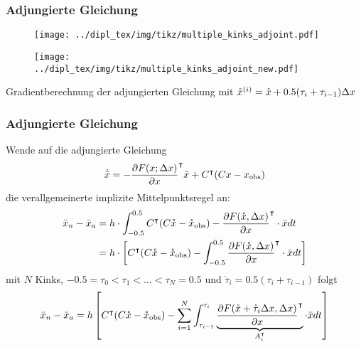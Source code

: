 \begin{frame}[<+->]
\frametitle{Adjungierte Gleichung}
\begin{figure}
\centering
\texttt{[image: ../dipl\_tex/img/tikz/multiple\_kinks\_adjoint.pdf]}
\end{figure}
\begin{figure}
\centering
\texttt{[image: ../dipl\_tex/img/tikz/multiple\_kinks\_adjoint\_new.pdf]}
\end{figure}
\centering
Gradientberechnung der adjungierten Gleichung mit $\mathring{x}^{(i)} = \mathring{x} + 0.5(\tau_i+\tau_{i-1})\Delta x$
\end{frame}

\begin{frame}[<+->]
\frametitle{Adjungierte Gleichung}
Wende auf die adjungierte Gleichung
\begin{align}
 \dot {\bar{x}} =  - \frac{\partial F(x;\Delta x)}{\partial x}^\intercal \bar{x} + C^\intercal (Cx-x_\text{obs}) 
\end{align}
\pause
die verallgemeinerte implizite Mittelpunktsregel an:
\begin{align}
\bar{x}_n - \bar{x}_a &= h\cdot \int_{-0.5}^{0.5}C^\intercal(C\mathring{x}-\mathring x_\text{obs}) - \frac{\partial F(\mathring{x},\Delta x)}{\partial x}^\intercal \cdot \bar{x} dt\\
		  &= h\cdot \left[ C^\intercal(C\mathring{x}-\mathring x_\text{obs}) -\int_{-0.5}^{0.5} \frac{\partial F(\mathring{x},\Delta x)}{\partial x}^\intercal \cdot \bar{x} dt\right]
\end{align}
\pause
mit $N$ Kinks, $-0.5 = \tau_0 <\tau_1 <\ldots < \tau_N=0.5$ und $\mathring \tau_i = 0.5 (\tau_i +\tau_{i-1})$ folgt
\begin{align}
\bar{x}_n - \bar{x}_a &= h\left[ C^\intercal(C\mathring{x}-\mathring x_\text{obs}) - \sum_{i=1}^N \int_{\tau_{i-1}}^{\tau_{i}}\underbrace{\frac{\partial F(\mathring{x}+\mathring \tau_i\Delta x,\Delta x)}{\partial x}^\intercal}_{A_i^\intercal} \cdot \bar{x} dt\right]\\
\end{align}
\end{frame}

